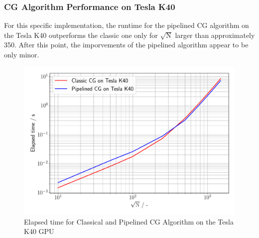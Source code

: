 \subsubsection{CG Algorithm Performance on Tesla K40}
For this specific implementation, the runtime for the pipelined CG algorithm on the Tesla K40 outperforms the classic one only for $\sqrt{\mathrm{N}}$ larger than approximately 350.
After this point, the imporvements of the pipelined algorithm appear to be only minor. 
\begin{figure}[h]
    \begin{center}
    \includegraphics[width=\linewidth]{figures/task_7_k40_plot.pdf}
    \caption{Elapsed time for Classical and Pipelined CG Algorithm on the Tesla K40 GPU}
    \end{center}
\end{figure}

